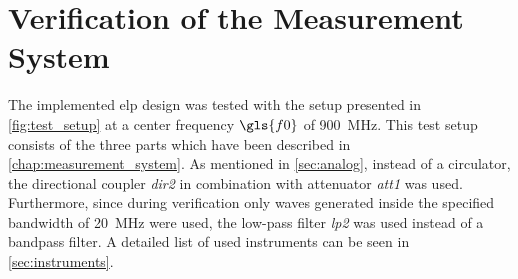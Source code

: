 \documentclass[12pt,a4paper,parskip=full,abstract=true,BCOR=12mm,twoside,open=right]{scrreprt}
\def\device#1{\textit{#1}}
\begin{document}

\chapter{Verification of the Measurement System}
\label{chap:verification}
\lstset{language=matlab}

The implemented \gls{elp} design was tested with the setup presented in
\cref{fig:test_setup} at a center frequency $\gls{f0}$ of \SI{900}{\mega\hertz}. This test setup consists of the three parts
which have been described in \cref{chap:measurement_system}. As mentioned in
\cref{sec:analog}, instead of a circulator, the directional coupler
\device{dir2} in combination with attenuator \device{att1} was used.
Furthermore, since during verification only waves generated inside
the specified bandwidth of \SI{20}{\mega\hertz} were used, the low-pass filter \device{lp2}
was used instead of a bandpass filter. A detailed list of used
instruments can be seen in \cref{sec:instruments}.
\end{document}

